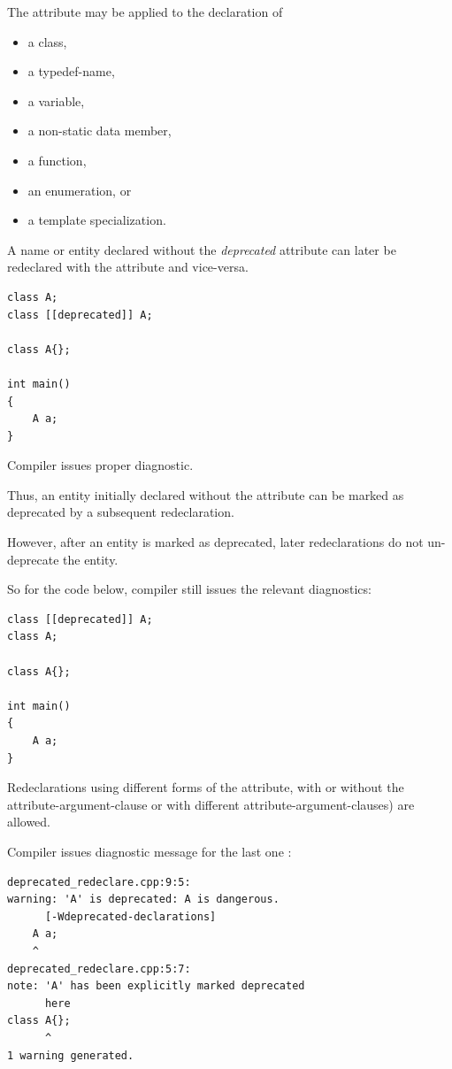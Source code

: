 \begin{Answer}[ref=ex023]
The attribute may be applied to the declaration of 
\begin{itemize}
\item a class, 
\item a typedef-name, 
\item a variable, 
\item a non-static data member, 
\item a function, 
\item an enumeration, or 
\item a template specialization.
\end{itemize}

A name or entity declared without the \emph{deprecated} attribute can later be redeclared with the attribute and vice-versa. 
\begin{lstlisting}
class A;
class [[deprecated]] A;

class A{};

int main()
{
    A a;
}
\end{lstlisting}

Compiler issues proper diagnostic.

Thus, an entity initially declared without the attribute can be marked as deprecated by
a subsequent redeclaration. 

However, after an entity is marked as deprecated, later redeclarations do not un-deprecate the entity.

So for the code below, compiler still issues the relevant diagnostics:
\begin{lstlisting}
class [[deprecated]] A;
class A;

class A{};

int main()
{
    A a;
}
\end{lstlisting}

Redeclarations using different forms of the attribute, with or without the attribute-argument-clause or with different attribute-argument-clauses) are allowed.

Compiler issues diagnostic message for the last one :
\begin{verbatim}
deprecated_redeclare.cpp:9:5: 
warning: 'A' is deprecated: A is dangerous.
      [-Wdeprecated-declarations]
    A a;
    ^
deprecated_redeclare.cpp:5:7: 
note: 'A' has been explicitly marked deprecated
      here
class A{};
      ^
1 warning generated.

\end{verbatim}
\end{Answer}

